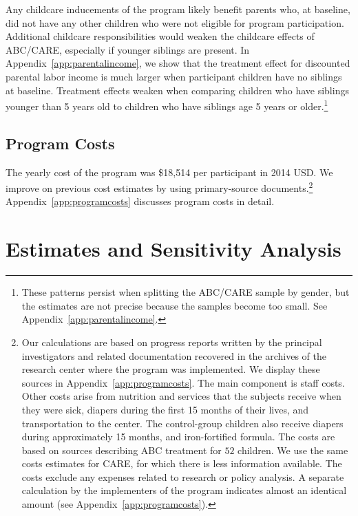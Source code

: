 Any childcare inducements of the program likely benefit parents who, at baseline, did not have any other children who were not eligible for program participation. Additional childcare responsibilities would weaken the childcare effects of ABC/CARE, especially if younger siblings are present. In Appendix~\ref{app:parentalincome}, we show that the treatment effect for discounted parental labor income is much larger when participant children have no siblings at baseline. Treatment effects weaken when comparing children who have siblings younger than 5 years old to children who have siblings age 5 years or older.\footnote{These patterns persist when splitting the ABC/CARE sample by gender, but the estimates are not precise because the samples become too small. See Appendix~\ref{app:parentalincome}.}

\subsection{Program Costs} \label{section:programscosts}

\noindent The yearly cost of the program was \$18,514 per participant in 2014 USD. We improve on previous cost estimates by using primary-source documents.\footnote{Our calculations are based on progress reports written by the principal investigators and related documentation recovered in the archives of the research center where the program was implemented. We display these sources in Appendix~\ref{app:programcosts}. The main component is staff costs. Other costs arise from nutrition and services that the subjects receive when they were sick, diapers during the first 15 months of their lives, and transportation to the center. The control-group children also receive diapers during approximately 15 months, and iron-fortified formula. The costs are based on sources describing ABC treatment for $52$ children. We use the same costs estimates for CARE, for which there is less information available. The costs exclude any expenses related to research or policy analysis. A separate calculation by the implementers of the program indicates almost an identical amount (see  Appendix~\ref{app:programcosts}).} Appendix~\ref{app:programcosts} discusses program costs in detail.

\section{Estimates and Sensitivity Analysis} \label{section:cbaresults}

